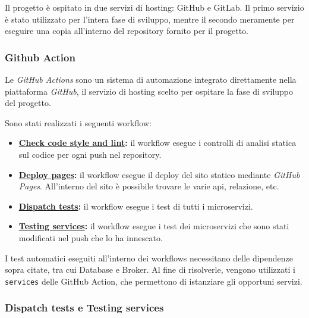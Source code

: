 Il progetto è ospitato in due servizi di hosting: GitHub e GitLab.
%
Il primo servizio è stato utilizzato per l'intera fase di sviluppo, mentre il secondo meramente per eseguire una copia all'interno del repository fornito per il progetto.

%
%
%
\subsubsection{Github Action}

Le \emph{GitHub Actions} sono un sistema di automazione integrato direttamente nella piattaforma \emph{GitHub}, il servizio di hosting scelto per ospitare la fase di sviluppo del progetto.

Sono stati realizzati i seguenti workflow:

\begin{itemize}
    \item \textbf{\href{https://github.com/zucchero-sintattico/piperchat/blob/develop/.github/workflows/check-style.yaml}{Check code style and lint}:} il workflow esegue i controlli di analisi statica sul codice per ogni push nel repository.

    \item \textbf{\href{https://github.com/zucchero-sintattico/piperchat/blob/develop/.github/workflows/pages.yml}{Deploy pages}:} il workflow esegue il deploy del sito statico mediante \emph{GitHub Pages}.
    All'interno del sito è possibile trovare le varie api, relazione, etc.

    \item \textbf{\href{https://github.com/zucchero-sintattico/piperchat/blob/develop/.github/workflows/dispatch-services-test.yaml}{Dispatch tests}:} il workflow esegue i test di tutti i microservizi.

    \item \textbf{\href{https://github.com/zucchero-sintattico/piperchat/actions/workflows/service-unit-testing.yaml}{Testing services}:} il workflow esegue i test dei microservizi che sono stati modificati nel push che lo ha innescato.
\end{itemize}

I test automatici eseguiti all'interno dei workflows necessitano delle dipendenze sopra citate, tra cui Database e Broker.
%
Al fine di risolverle, vengono utilizzati i \texttt{services} delle GitHub Action, che permettono di istanziare gli opportuni servizi.

%
%
%
\subsubsection{Dispatch tests e Testing services}

